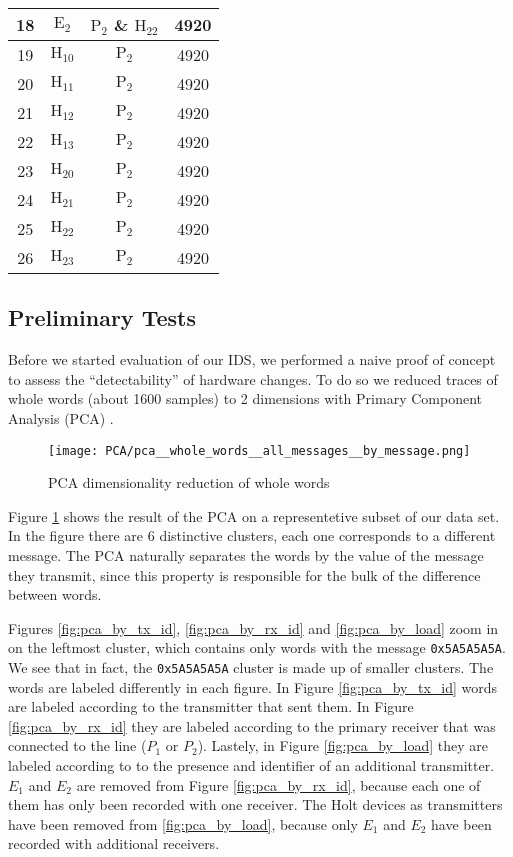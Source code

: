 \documentclass[compsoc,conference,a4paper]{IEEEtran}
\newcommand{\sublevel}[1]{\subsection{#1}}
\newcommand{\sublevel}[1]{\section{#1}}
\begin{document}
\begin{table}
\begin{tabular}{|c | c c c|}
      \hline
      18 & \(\text{E}_2\) & \(\text{P}_2\) \& \(\text{H}_{22}\) & 4920 \\
      \hline
      19 & \(\text{H}_{10}\) & \(\text{P}_2\) & 4920 \\
      \hline
      20 & \(\text{H}_{11}\) & \(\text{P}_2\) & 4920 \\
      \hline
      21 & \(\text{H}_{12}\) & \(\text{P}_2\) & 4920 \\
      \hline
      22 & \(\text{H}_{13}\) & \(\text{P}_2\) & 4920 \\
      \hline
      23 & \(\text{H}_{20}\) & \(\text{P}_2\) & 4920 \\
      \hline
      24 & \(\text{H}_{21}\) & \(\text{P}_2\) & 4920 \\
      \hline
      25 & \(\text{H}_{22}\) & \(\text{P}_2\) & 4920 \\
      \hline
      26 & \(\text{H}_{23}\) & \(\text{P}_2\) & 4920 \\
      \hline
    \end{tabular}
  \end{table}
  
\sublevel{Preliminary Tests}
  Before we started evaluation of our IDS, we performed a naive proof of concept to assess the ``detectability'' of hardware changes. To do so we reduced traces of whole words (about 1600 samples) to 2 dimensions with Primary Component Analysis (PCA) \cite{pearson1901liii}.
  
  \begin{figure}[t]
    \centering
    \texttt{[image: PCA/pca\_\_whole\_words\_\_all\_messages\_\_by\_message.png]}
    \caption{PCA dimensionality reduction of whole words}
    \label{fig:pca_by_message}
  \end{figure}
  
  Figure \ref{fig:pca_by_message} shows the result of the PCA on a representetive subset of our data set. In the figure there are 6 distinctive clusters, each one corresponds to a different message. The PCA naturally separates the words by the value of the message they transmit, since this property is responsible for the bulk of the difference between words.
  
  Figures \ref{fig:pca_by_tx_id}, \ref{fig:pca_by_rx_id} and \ref{fig:pca_by_load} zoom in on the leftmost cluster, which contains only words with the message \texttt{0x5A5A5A5A}. We see that in fact, the \texttt{0x5A5A5A5A} cluster is made up of smaller clusters. The words are labeled differently in each figure. In Figure \ref{fig:pca_by_tx_id} words are labeled according to the transmitter that sent them. In Figure \ref{fig:pca_by_rx_id} they are labeled according to the primary receiver that was connected to the line ($P_1$ or $P_2$). Lastely, in Figure \ref{fig:pca_by_load} they are labeled according to to the presence and identifier of an additional transmitter. $E_1$ and $E_2$ are removed from Figure \ref{fig:pca_by_rx_id}, because each one of them has only been recorded with one receiver. The Holt devices as transmitters have been removed from \ref{fig:pca_by_load}, because only $E_1$ and $E_2$ have been recorded with additional receivers.
  
\end{document}
